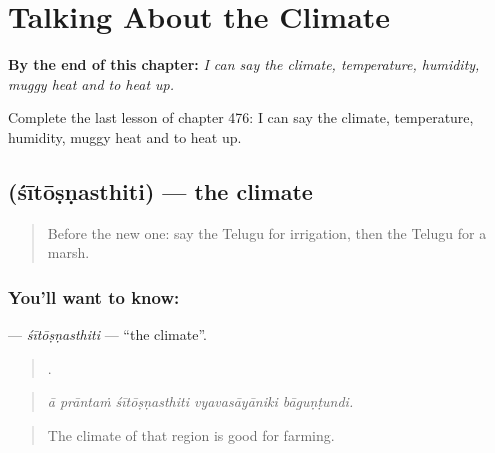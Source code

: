 
\chapter{Talking About the Climate}
\label{ch:te-talking-about-the-climate}

\begin{chapteropening}
\textbf{By the end of this chapter:} \emph{I can say the climate, temperature, humidity, muggy heat and to heat up.}

Complete the last lesson of chapter 476: I can say the climate, temperature, humidity, muggy heat and to heat up.
\end{chapteropening}

\section[\texorpdfstring{\te{శీతోష్ణస్థితి} (śītōṣṇasthiti)}{శీతోష్ణస్థితి (śītōṣṇasthiti)}]{ (śītōṣṇasthiti) — the climate}

\label{lesson:TE-C476-sitosnasthiti}



\begin{quote}
Before the new one: say the Telugu for irrigation, then the Telugu for a marsh.
\end{quote}

\subsection*{You'll want to know: }
\textbf{} — \emph{śītōṣṇasthiti} — \textquotedblleft{}the climate\textquotedblright{}.

\begin{quote}
    .
\end{quote}

\begin{quote}
\emph{ā prāntaṁ śītōṣṇasthiti vyavasāyāniki bāguṇṭundi.}
\end{quote}

\begin{quote}
The climate of that region is good for farming.
\end{quote}

